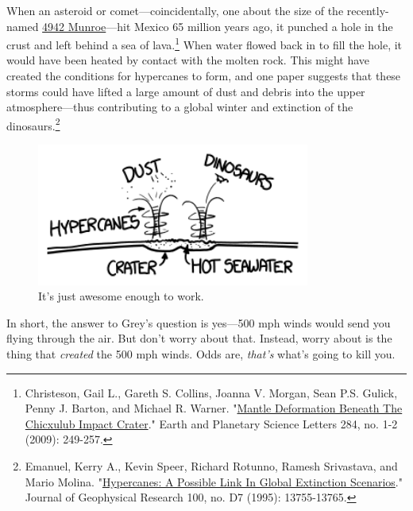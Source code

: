 {{When an asteroid or comet—coincidentally, one about the size of the recently-named \href{http://blog.xkcd.com/2013/09/30/asteroid-4942-munroe/}{4942 Munroe}—hit Mexico 65 million years ago, it punched a hole in the crust and left behind a sea of lava.{\footnote{Christeson, Gail L., Gareth S. Collins, Joanna V. Morgan, Sean P.S. Gulick, Penny J. Barton, and Michael R. Warner. "\href{https://spiral.imperial.ac.uk/bitstream/10044/1/4214/1/icpub.pdf}{Mantle Deformation Beneath The Chicxulub Impact Crater}." Earth and Planetary Science Letters 284, no. 1-2 (2009): 249-257.} } When water flowed back in to fill the hole, it would have been heated by contact with the molten rock. This might have created the conditions for hypercanes to form, and one paper suggests that these storms could have lifted a large amount of dust and debris into the upper atmosphere—thus contributing to a global winter and extinction of the dinosaurs.{\footnote{Emanuel, Kerry A., Kevin Speer, Richard Rotunno, Ramesh Srivastava, and Mario Molina. "\href{ftp://texmex.mit.edu/pub/emanuel/PAPERS/hypercane95.pdf} {Hypercanes: A Possible Link In Global Extinction Scenarios}." Journal of Geophysical Research 100, no. D7 (1995): 13755-13765.} } }

\begin{figure}[!htbp]
\centering
\includegraphics[scale=0.5, max width=0.8\textwidth]{imgs/a/66/wind_hypercane.png}
\caption{It's just awesome enough to work.}
\end{figure}

{In short, the answer to Grey's question is yes—500 mph winds would send you flying through the air. But don't worry about that. Instead, worry about is the thing that \emph{created} the 500 mph winds. Odds are, \emph{that's} what's going to kill you.}

}
